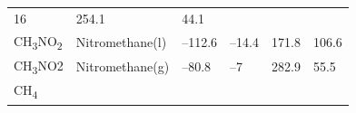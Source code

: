 \documentclass[
  9pt,
]{extbook}
\theoremstyle{definition}
\theoremstyle{definition}
\theoremstyle{definition}
\theoremstyle{remark}
\begin{document}
\begin{longtable}[]{@{}llllll@{}}
\begin{minipage}[t]{0.15\columnwidth}
16\strut
\end{minipage} & \begin{minipage}[t]{0.14\columnwidth}\raggedright
254.1\strut
\end{minipage} & \begin{minipage}[t]{0.14\columnwidth}\raggedright
44.1\strut
\end{minipage}\tabularnewline
\begin{minipage}[t]{0.07\columnwidth}\raggedright
CH\textsubscript{3}NO\textsubscript{2}\strut
\end{minipage} & \begin{minipage}[t]{0.17\columnwidth}\raggedright
Nitromethane(l)\strut
\end{minipage} & \begin{minipage}[t]{0.15\columnwidth}\raggedright
--112.6\strut
\end{minipage} & \begin{minipage}[t]{0.15\columnwidth}\raggedright
--14.4\strut
\end{minipage} & \begin{minipage}[t]{0.14\columnwidth}\raggedright
171.8\strut
\end{minipage} & \begin{minipage}[t]{0.14\columnwidth}\raggedright
106.6\strut
\end{minipage}\tabularnewline
\begin{minipage}[t]{0.07\columnwidth}\raggedright
CH\textsubscript{3}NO2\strut
\end{minipage} & \begin{minipage}[t]{0.17\columnwidth}\raggedright
Nitromethane(g)\strut
\end{minipage} & \begin{minipage}[t]{0.15\columnwidth}\raggedright
--80.8\strut
\end{minipage} & \begin{minipage}[t]{0.15\columnwidth}\raggedright
--7\strut
\end{minipage} & \begin{minipage}[t]{0.14\columnwidth}\raggedright
282.9\strut
\end{minipage} & \begin{minipage}[t]{0.14\columnwidth}\raggedright
55.5\strut
\end{minipage}\tabularnewline
\begin{minipage}[t]{0.07\columnwidth}\raggedright
CH\textsubscript{4}\strut
\end{minipage} & \begin{minipage}[t]{0.17\columnwidth}\raggedright

\end{minipage}
\end{longtable}
\end{document}
